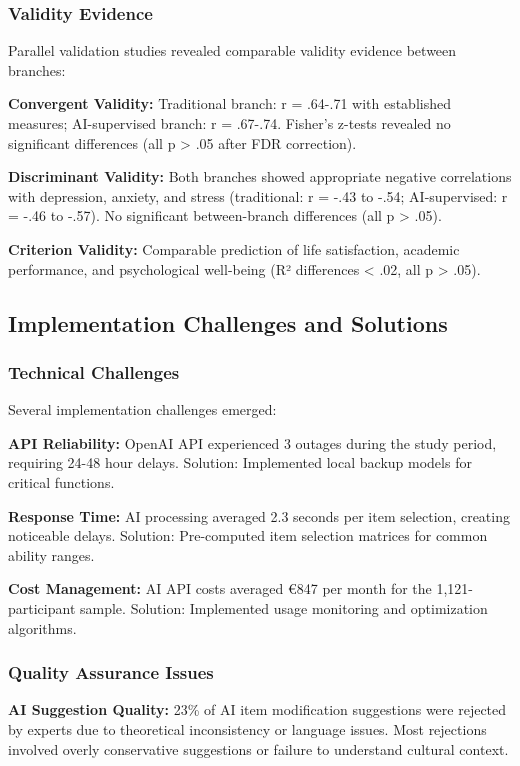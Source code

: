 \documentclass[12pt,a4paper]{article}
\begin{document}
\subsubsection{Validity Evidence}

Parallel validation studies revealed comparable validity evidence between branches:

\textbf{Convergent Validity:} Traditional branch: r = .64-.71 with established measures; AI-supervised branch: r = .67-.74. Fisher's z-tests revealed no significant differences (all p > .05 after FDR correction).

\textbf{Discriminant Validity:} Both branches showed appropriate negative correlations with depression, anxiety, and stress (traditional: r = -.43 to -.54; AI-supervised: r = -.46 to -.57). No significant between-branch differences (all p > .05).

\textbf{Criterion Validity:} Comparable prediction of life satisfaction, academic performance, and psychological well-being (R² differences < .02, all p > .05).

\subsection{Implementation Challenges and Solutions}

\subsubsection{Technical Challenges}

Several implementation challenges emerged:

\textbf{API Reliability:} OpenAI API experienced 3 outages during the study period, requiring 24-48 hour delays. Solution: Implemented local backup models for critical functions.

\textbf{Response Time:} AI processing averaged 2.3 seconds per item selection, creating noticeable delays. Solution: Pre-computed item selection matrices for common ability ranges.

\textbf{Cost Management:} AI API costs averaged €847 per month for the 1,121-participant sample. Solution: Implemented usage monitoring and optimization algorithms.

\subsubsection{Quality Assurance Issues}

\textbf{AI Suggestion Quality:} 23\% of AI item modification suggestions were rejected by experts due to theoretical inconsistency or language issues. Most rejections involved overly conservative suggestions or failure to understand cultural context.
\end{document}
